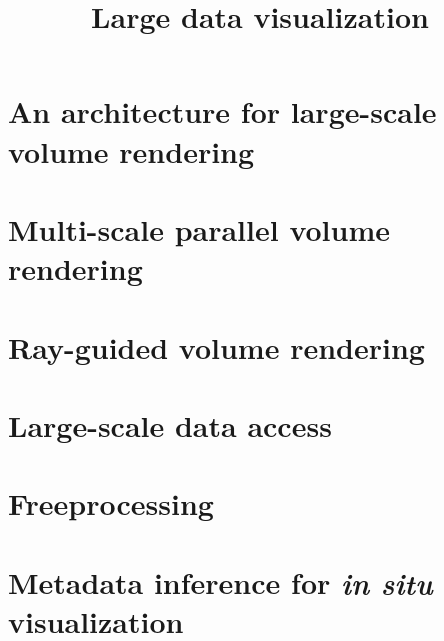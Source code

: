 \documentclass[12pt,twoside,headsepline,titlepage]{thesis}
\title{Large data visualization}
\begin{document}



\chapter{An architecture for large-scale volume rendering}


\chapter{Multi-scale parallel volume rendering}


\chapter{Ray-guided volume rendering}


\chapter{Large-scale data access}


\chapter{Freeprocessing}


\chapter{Metadata inference for \textit{in situ} visualization}




\end{document}
